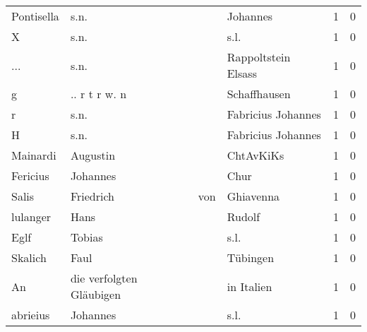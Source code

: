 \begin{center}
\begin{tiny}
\begin{longtabu}{llllrr}
               Pontisella &                               s.n. &             &                                    Johannes &          1 &         0 \\
                        X &                               s.n. &             &                                        s.l. &          1 &         0 \\
                      ... &                               s.n. &             &                         Rappoltstein Elsass &          1 &         0 \\
                        g &                      .. r t r w. n &             &                                Schaffhausen &          1 &         0 \\
                        r &                               s.n. &             &                          Fabricius Johannes &          1 &         0 \\
                        H &                               s.n. &             &                          Fabricius Johannes &          1 &         0 \\
                 Mainardi &                           Augustin &             &                                   ChtAvKiKs &          1 &         0 \\
                 Fericius &                           Johannes &             &                                        Chur &          1 &         0 \\
                    Salis &                          Friedrich &         von &                                   Ghiavenna &          1 &         0 \\
                 lulanger &                               Hans &             &                                      Rudolf &          1 &         0 \\
                     Eglf &                             Tobias &             &                                        s.l. &          1 &         0 \\
                  Skalich &                               Faul &             &                                    Tübingen &          1 &         0 \\
                       An &           die verfolgten Gläubigen &             &                                  in Italien &          1 &         0 \\
                 abrieius &                           Johannes &             &                                        s.l. &          1 &         0 \\

\end{longtabu}
\end{tiny}
\end{center}
